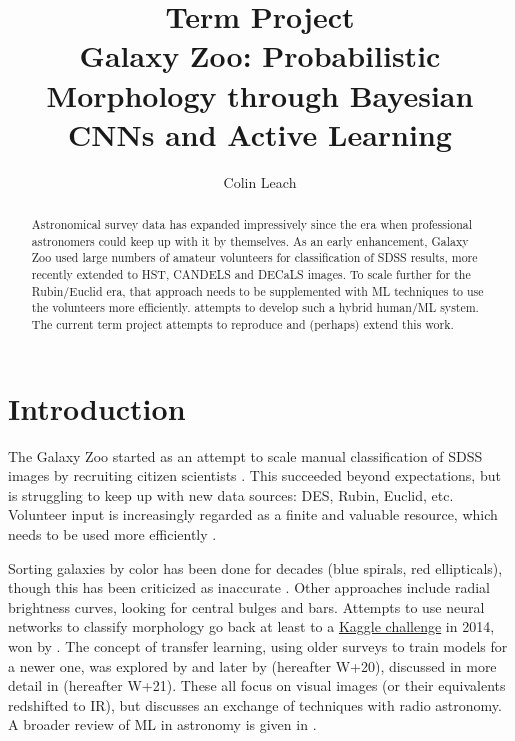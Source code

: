 \documentclass[preprint]{aastex63}
\begin{document}
\title{Term Project \\Galaxy Zoo: Probabilistic Morphology through Bayesian CNNs and Active Learning}

\author[0000-0003-3608-1546]{Colin Leach}

\begin{abstract}

Astronomical survey data has expanded impressively since the era when professional astronomers could keep up with it by themselves. As an early enhancement, Galaxy Zoo used large numbers of amateur volunteers for classification of SDSS results, more recently extended to HST, CANDELS and DECaLS images. To scale further for the Rubin/Euclid era, that approach needs to be supplemented with ML techniques to use the volunteers more efficiently. \citet{walmsley_galaxy_2020} attempts to develop such a hybrid human/ML system. The current term project attempts to reproduce and (perhaps) extend this work.\\

\end{abstract} 

\section{Introduction} \label{sec:intro}


The Galaxy Zoo started as an attempt to scale manual classification of SDSS images by recruiting citizen scientists \citep{2008MNRAS.389.1179L, lintott_crowd_2019}. This succeeded beyond expectations, but is struggling to keep up with new data sources: DES, Rubin, Euclid, etc. Volunteer input is increasingly regarded as a finite and valuable resource, which needs to be used more efficiently \citep{2020IAUS..341...99D}.

Sorting galaxies by color has been done for decades (blue spirals, red ellipticals), though this has been criticized as inaccurate \citep{smethurst_quantifying_2022}. Other approaches include radial brightness curves, looking for central bulges and bars. Attempts to use neural networks to classify morphology go back at least to a \href{https://www.kaggle.com/c/galaxy-zoo-the-galaxy-challenge}{Kaggle challenge} in 2014, won by \citet{2015MNRAS.450.1441D}. The concept of transfer learning, using older surveys to train models for a newer one, was explored by \citet{2019MNRAS.484...93D} and later by \citet{walmsley_galaxy_2020} (hereafter W+20), discussed in more detail in \citet{2021MNRAS} (hereafter W+21). These all focus on visual images (or their equivalents redshifted to IR), but \citet{2021arXiv211104353F} discusses an exchange of techniques with radio astronomy. A broader review of ML in astronomy is given in \citet{2020WDMKD..10.1349F}.
\end{document}
